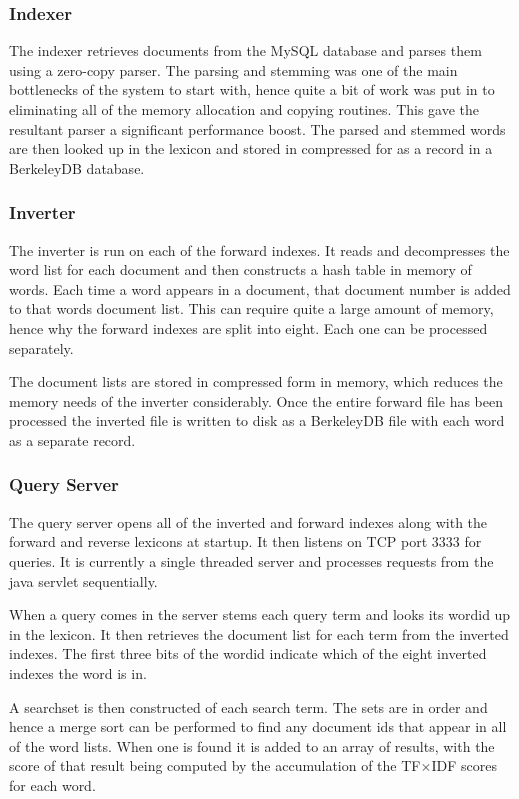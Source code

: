 \subsubsection{Indexer}
The indexer retrieves documents from the MySQL database and parses them using a zero-copy parser.  The parsing and stemming was one of the main bottlenecks of the system to start with, hence quite a bit of work was put in to eliminating all of the memory allocation and copying routines.  This gave the resultant parser a significant performance boost.  The parsed and stemmed words are then looked up in the lexicon and stored in compressed for as a record in a BerkeleyDB database.

\subsubsection{Inverter}
The inverter is run on each of the forward indexes.  It reads and decompresses the word list for each document and then constructs a hash table in memory of words.  Each time a word appears in a document, that document number is added to that words document list.  This can require quite a large amount of memory, hence why the forward indexes are split into eight.  Each one can be processed separately.  

The document lists are stored in compressed form in memory, which reduces the memory needs of the inverter considerably.  Once the entire forward file has been processed the inverted file is written to disk as a BerkeleyDB file with each word as a separate record.

\subsubsection{Query Server}
The query server opens all of the inverted and forward indexes along with the forward and reverse lexicons at startup.  It then listens on TCP port 3333 for queries.  It is currently a single threaded server and processes requests from the java servlet sequentially.

When a query comes in the server stems each query term and looks its wordid up in the lexicon.  It then retrieves the document list for each term from the inverted indexes.  The first three bits of the wordid indicate which of the eight inverted indexes the word is in.

A searchset is then constructed of each search term.  The sets are in order and hence a merge sort can be performed to find any document ids that appear in all of the word lists.  When one is found it is added to an array of results, with the score of that result being computed by the accumulation of the TF$\times$IDF scores for each word.

